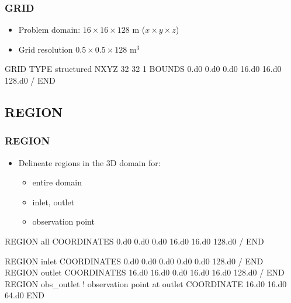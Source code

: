 \documentclass{beamer}
\newcommand\bluecomment[1]{{{\color{blue} #1}}}
\begin{document}
\begin{frame}\frametitle{\bf GRID}

\begin{itemize}
  \item Problem domain: $16 \times 16 \times 128$ m ($x \times y \times z$)
  \item Grid resolution $0.5 \times 0.5 \times 128$ m$^3$
\end{itemize}

\begin{semiverbatim}
GRID
  TYPE structured
  NXYZ 32 32 1
  BOUNDS
    0.d0 0.d0 0.d0
    16.d0 16.d0 128.d0
  /
END
\end{semiverbatim}

\end{frame}

\subsection{REGION}

\begin{frame}\frametitle{\bf REGION}

\begin{itemize}
  \item Delineate regions in the 3D domain for:
  \begin{itemize}
    \item entire domain
    \item inlet, outlet
    \item observation point
  \end{itemize}
\end{itemize}

\begin{semiverbatim}
REGION all
  COORDINATES
    0.d0 0.d0 0.d0
    16.d0 16.d0 128.d0
  /
END

\newpage
\vspace{-5mm}
REGION inlet
  COORDINATES
    0.d0 0.d0 0.d0
    0.d0 0.d0 128.d0
  /
END
REGION outlet
  COORDINATES
    16.d0 16.d0 0.d0
    16.d0 16.d0 128.d0
  /
END
REGION obs_outlet \bluecomment{! observation point at outlet}
  COORDINATE 16.d0 16.d0 64.d0
END

\end{semiverbatim}

\end{frame}
\end{document}
